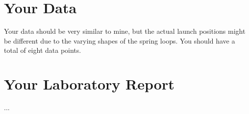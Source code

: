 \section{Your Data}
Your data should be very similar to mine, but the actual launch positions might be different due to the varying shapes of the spring loops. You should have a total of eight data points.
\newpage
\section{Your Laboratory Report}
...
\newpage
